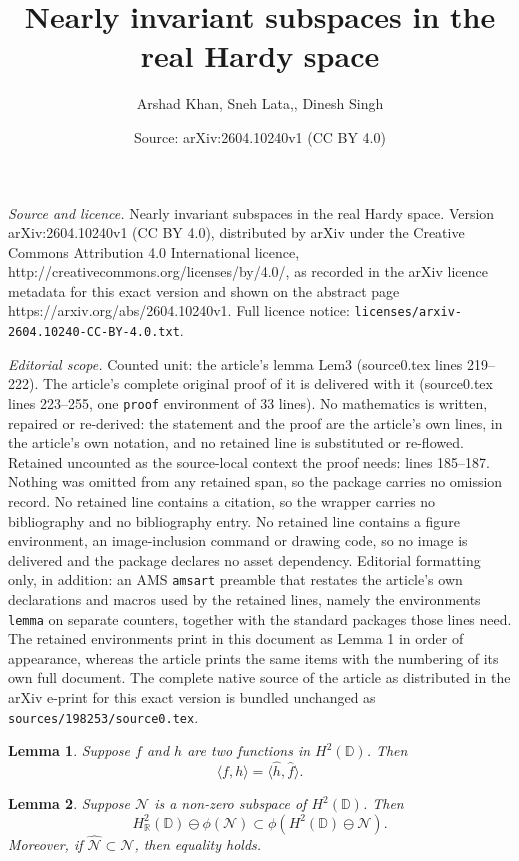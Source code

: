 \documentclass[10pt,a4paper]{amsart}
\title{Nearly invariant subspaces in the real Hardy space}
\author{Arshad Khan, Sneh Lata,, Dinesh Singh}
\date{Source: arXiv:2604.10240v1 (CC BY 4.0)}
\newtheorem{lemma}{Lemma}
\begin{document}
\maketitle

\noindent\emph{Source and licence.} Nearly invariant subspaces in the real Hardy space. Version arXiv:2604.10240v1 (CC BY 4.0), distributed by arXiv under the Creative Commons Attribution 4.0 International licence, http://creativecommons.org/licenses/by/4.0/, as recorded in the arXiv licence metadata for this exact version and shown on the abstract page https://arxiv.org/abs/2604.10240v1. Full licence notice: \texttt{licenses/arxiv-2604.10240-CC-BY-4.0.txt}.\par\smallskip

\noindent\textit{Editorial scope.} Counted unit: the article's lemma Lem3 (source0.tex lines 219--222). The article's complete original proof of it is delivered with it (source0.tex lines 223--255, one \texttt{proof} environment of 33 lines). No mathematics is written, repaired or re-derived: the statement and the proof are the article's own lines, in the article's own notation, and no retained line is substituted or re-flowed.  Retained uncounted as the source-local context the proof needs: lines 185--187.  Nothing was omitted from any retained span, so the package carries no omission record.  No retained line contains a citation, so the wrapper carries no bibliography and no bibliography entry.  No retained line contains a figure environment, an image-inclusion command or drawing code, so no image is delivered and the package declares no asset dependency.  Editorial formatting only, in addition: an AMS \texttt{amsart} preamble that restates the article's own declarations and macros used by the retained lines, namely the environments \texttt{lemma} on separate counters, together with the standard packages those lines need.  The retained environments print in this document as Lemma 1 in order of appearance, whereas the article prints the same items with the numbering of its own full document.  The complete native source of the article as distributed in the arXiv e-print for this exact version is bundled unchanged as \texttt{sources/198253/source0.tex}.
\begin{lemma}\label{Lem1}
Suppose $f$ and $h$ are two functions in $H^2(\mathbb{D})$. Then $$\langle f, h \rangle = \langle \widehat{h}, \widehat{f} \rangle.$$   
\end{lemma}

\begin{lemma}\label{Lem3}
Suppose $\mathcal{N}$ is a non-zero subspace of $H^2(\mathbb{D})$. Then $$H^2_{\mathbb{R}}(\mathbb{D}) \ominus \phi(\mathcal{N})\subset\phi(H^2(\mathbb{D})\ominus \mathcal{N}).$$
Moreover, if $\widehat{\mathcal{N}}\subset \mathcal{N}$, then equality holds.
\end{lemma}
\end{document}
